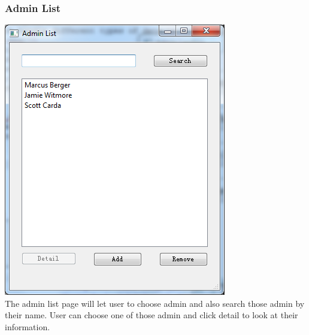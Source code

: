 \subsubsection{Admin List}
\includegraphics[scale=0.5]{pics/admin_list.png}\\
The admin list page will let user to choose admin and also search those admin by their name. User can choose one of those admin and click detail to look at their information.\\

